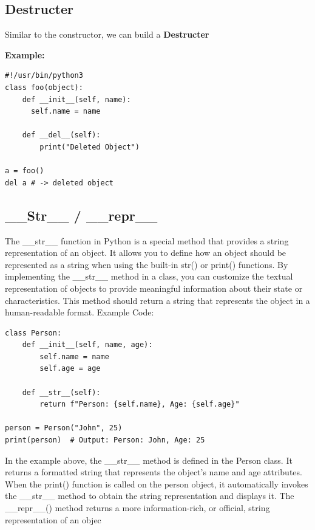 \documentclass{report}
\begin{document}
    \subsection{Destructer}
    \bigbreak \noindent 
    Similar to the constructor, we can build a \textbf{Destructer}
    \bigbreak \noindent 
    \begin{mdframed}
      \textbf{Example: }
      \begin{verbatim}
#!/usr/bin/python3
class foo(object):
    def __init__(self, name):
      self.name = name

    def __del__(self):
        print("Deleted Object")

a = foo()
del a # -> deleted object
      \end{verbatim}
    \end{mdframed}
    \bigbreak \noindent 

    \bigbreak \noindent \bigbreak \noindent 
    \subsection{\_\_Str\_\_ / \_\_repr\_\_}
    \bigbreak \noindent 
    The \_\_str\_\_ function in Python is a special method that provides a string representation of an object. It allows you to define how an object should be represented as a string when using the built-in str() or print() functions.
    \bigbreak \noindent 
    By implementing the \_\_str\_\_ method in a class, you can customize the textual representation of objects to provide meaningful information about their state or characteristics. This method should return a string that represents the object in a human-readable format.
    \bigbreak \noindent 
    Example Code:
    \begin{verbatim}
class Person:
    def __init__(self, name, age):
        self.name = name
        self.age = age

    def __str__(self):
        return f"Person: {self.name}, Age: {self.age}"

person = Person("John", 25)
print(person)  # Output: Person: John, Age: 25
    \end{verbatim}
    In the example above, the \_\_str\_\_ method is defined in the Person class. It returns a formatted string that represents the object's name and age attributes. When the print() function is called on the person object, it automatically invokes the \_\_str\_\_ method to obtain the string representation and displays it.
    \bigbreak \noindent 
    The \_\_repr\_\_() method returns a more information-rich, or official, string representation of an objec
\end{document}
